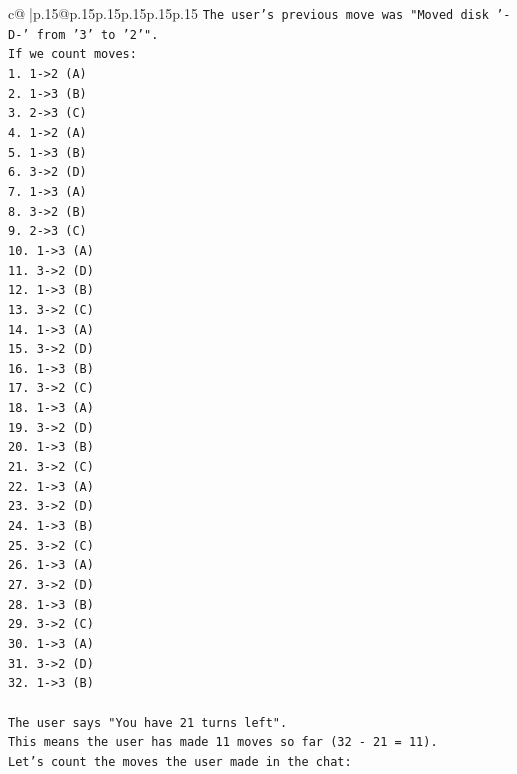 \documentclass{article}
\begin{document}
{\begin{supertabular}{c@{$\;$}|p{.15\linewidth}@{}p{.15\linewidth}p{.15\linewidth}p{.15\linewidth}p{.15\linewidth}p{.15\linewidth}}
{{{\texttt{The user's previous move was "Moved disk '{-}D{-}' from '3' to '2'".} \\
\texttt{If we count moves:} \\
\texttt{1. 1{-}>2 (A)} \\
\texttt{2. 1{-}>3 (B)} \\
\texttt{3. 2{-}>3 (C)} \\
\texttt{4. 1{-}>2 (A)} \\
\texttt{5. 1{-}>3 (B)} \\
\texttt{6. 3{-}>2 (D)} \\
\texttt{7. 1{-}>3 (A)} \\
\texttt{8. 3{-}>2 (B)} \\
\texttt{9. 2{-}>3 (C)} \\
\texttt{10. 1{-}>3 (A)} \\
\texttt{11. 3{-}>2 (D)} \\
\texttt{12. 1{-}>3 (B)} \\
\texttt{13. 3{-}>2 (C)} \\
\texttt{14. 1{-}>3 (A)} \\
\texttt{15. 3{-}>2 (D)} \\
\texttt{16. 1{-}>3 (B)} \\
\texttt{17. 3{-}>2 (C)} \\
\texttt{18. 1{-}>3 (A)} \\
\texttt{19. 3{-}>2 (D)} \\
\texttt{20. 1{-}>3 (B)} \\
\texttt{21. 3{-}>2 (C)} \\
\texttt{22. 1{-}>3 (A)} \\
\texttt{23. 3{-}>2 (D)} \\
\texttt{24. 1{-}>3 (B)} \\
\texttt{25. 3{-}>2 (C)} \\
\texttt{26. 1{-}>3 (A)} \\
\texttt{27. 3{-}>2 (D)} \\
\texttt{28. 1{-}>3 (B)} \\
\texttt{29. 3{-}>2 (C)} \\
\texttt{30. 1{-}>3 (A)} \\
\texttt{31. 3{-}>2 (D)} \\
\texttt{32. 1{-}>3 (B)} \\
\\ 
\texttt{The user says "You have 21 turns left".} \\
\texttt{This means the user has made 11 moves so far (32 {-} 21 = 11).} \\
\texttt{Let's count the moves the user made in the chat:} \\
}}}
\end{supertabular}}
\end{document}
